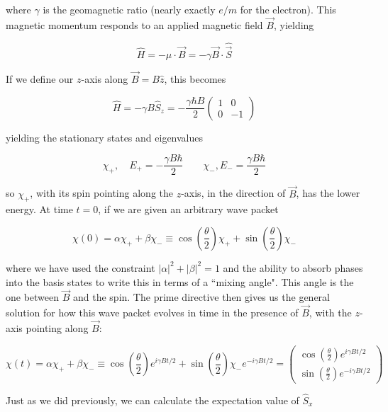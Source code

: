 where $\gamma$ is the geomagnetic ratio (nearly exactly $e/m$ for the
electron). This magnetic momentum responds to an applied magnetic field
$\vec{B}$, yielding 

\[
\hat{H} = -\mu \cdot \vec{B} = -\gamma \vec{B} \cdot \hat{\vec{S}}
\] \vspace{3px}

If we define our $z$-axis along $\vec{B} = B \hat{z}$, this becomes 

\[
\hat{H} = -\gamma B \hat{S}_z = -\frac{\gamma \hbar B}{2} \begin{pmatrix}
  1 & 0 \\ 0 & -1
\end{pmatrix} 
\] \vspace{3px}

yielding the stationary states and eigenvalues 

\[
\chi_+, \quad E_+ = -\frac{\gamma B \hbar}{2}\qquad \chi_-, E_- = \frac{\gamma
B \hbar}{2}
\] \vspace{3px}

so $\chi_+$, with its spin pointing along the  $z$-axis, in the direction of
$\vec{B}$, has the lower energy. At time $t=0$, if we are given an arbitrary
wave packet 

\[
\chi(0) = \alpha \chi_+ + \beta\chi_- \equiv \cos \left( \frac{\theta}{2}
\right) \chi_+ + \sin \left( \frac{\theta}{2} \right) \chi_-  
\] \vspace{3px}

where we have used the constraint $|\alpha|^2 + |\beta|^2 = 1$ and the ability
to absorb phases into the basis states to write this in terms of a ``mixing
angle". This angle is the one between $\vec{B}$ and the spin. The prime
directive then gives us the general solution for how this wave packet evolves
in time in the presence of $\vec{B}$, with the $z$-axis pointing along
$\vec{B}$: 

\[
\chi(t) = \alpha \chi_+ + \beta \chi_- \equiv \cos \left( \frac{\theta}{2}
\right) e^{i\gamma B t / 2} + \sin \left( \frac{\theta}{2} \right) \chi_-
e^{-i\gamma Bt / 2} = \begin{pmatrix}
  \cos \left( \frac{\theta}{2} \right) e^{i\gamma Bt / 2} \\ \sin \left(
  \frac{\theta}{2} \right) e^{-i\gamma Bt/2}  
\end{pmatrix}     
\] \vspace{3px}

Just as we did previously, we can calculate the expectation value of $\hat{S}_x$

